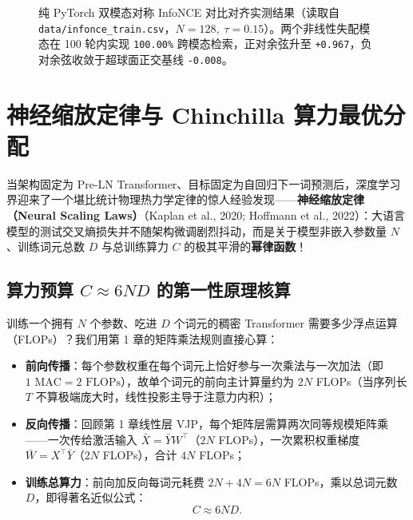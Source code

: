 \begin{figure}[htbp]
\caption{纯 PyTorch 双模态对称 InfoNCE 对比对齐实测结果（读取自 \texttt{data/infonce\_train.csv}，$N=128,\; \tau=0.15$）。两个非线性失配模态在 100 轮内实现 \texttt{100.00\%} 跨模态检索，正对余弦升至 \texttt{+0.967}，负对余弦收敛于超球面正交基线 \texttt{-0.008}。}
\label{fig:infonce-train}
\end{figure}

\section{神经缩放定律与 Chinchilla 算力最优分配}
\label{sec:scaling-laws}

当架构固定为 Pre-LN Transformer、目标固定为自回归下一词预测后，深度学习界迎来了一个堪比统计物理热力学定律的惊人经验发现——\textbf{神经缩放定律（Neural Scaling Laws）}（Kaplan et al., 2020; Hoffmann et al., 2022）：大语言模型的测试交叉熵损失并不随架构微调剧烈抖动，而是关于模型非嵌入参数量 $N$、训练词元总数 $D$ 与总训练算力 $C$ 的极其平滑的\textbf{幂律函数}！

\subsection{算力预算 $C \approx 6ND$ 的第一性原理核算}

训练一个拥有 $N$ 个参数、吃进 $D$ 个词元的稠密 Transformer 需要多少浮点运算（FLOPs）？我们用第 1 章的矩阵乘法规则直接心算：
\begin{itemize}
  \item \textbf{前向传播}：每个参数权重在每个词元上恰好参与一次乘法与一次加法（即 $1\text{ MAC} = 2\text{ FLOPs}$），故单个词元的前向主计算量约为 $2N$ FLOPs（当序列长 $T$ 不算极端庞大时，线性投影主导于注意力内积）；
  \item \textbf{反向传播}：回顾第 1 章线性层 VJP，每个矩阵层需算两次同等规模矩阵乘——一次传给激活输入 $\bar{X} = \bar{Y} W^\top$（$2N$ FLOPs），一次累积权重梯度 $\bar{W} = X^\top \bar{Y}$（$2N$ FLOPs），合计 $4N$ FLOPs；
  \item \textbf{训练总算力}：前向加反向每词元耗费 $2N + 4N = 6N$ FLOPs，乘以总词元数 $D$，即得著名近似公式：
  \begin{equation}
    C \approx 6 N D.
    \label{eq:compute-6nd}
  \end{equation}
\end{itemize}

